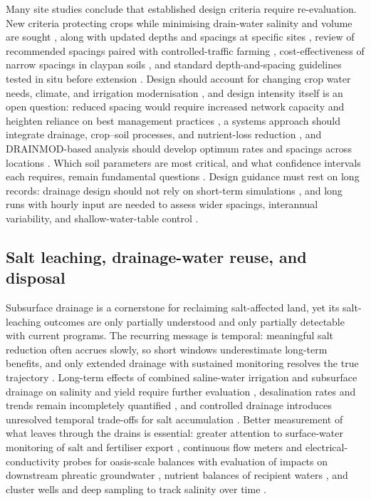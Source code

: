 Many site studies conclude that established design criteria require re-evaluation.
New criteria protecting crops while minimising drain-water salinity and volume are
sought \parencite{Christen2001}, along with updated depths and spacings at specific
sites \parencite{Muhammad2021,Malota2016,Bahçeci2009,Kahlown2002}, review of
recommended spacings paired with controlled-traffic farming
\parencite{Mante2022,Mante2018}, cost-effectiveness of narrow spacings in claypan
soils \parencite{Nelson2017}, and standard depth-and-spacing guidelines tested
in situ before extension \parencite{HajAmor2019}. Design should account for
changing crop water needs, climate, and irrigation modernisation
\parencite{Rui2024,Akram2013,Ziaeifar2025,Ritzema2023,Ritzema2007,Ritzema2006,Ritzema2011},
and design intensity itself is an open question: reduced spacing would require
increased network capacity and heighten reliance on best management practices
\parencite{Singh2009,Dialameh2025}, a systems approach should integrate drainage,
crop--soil processes, and nutrient-loss reduction \parencite{Castellano2019}, and
DRAINMOD-based analysis should develop optimum rates and spacings across locations
\parencite{Strock2011}. Which soil parameters are most critical, and what
confidence intervals each requires, remain fundamental questions
\parencite{Ayars2015,SHIRMOHAMMADI1995,HARDJOAMIDJOJO1982}. Design guidance must
rest on long records: drainage design should not rely on short-term simulations
\parencite{Wang2006b}, and long runs with hourly input are needed to assess wider
spacings, interannual variability, and shallow-water-table control
\parencite{Ale2009,Häggblom2019,Malota2015,Salo2019,Kladivko2023,Chang2012}.

\subsection{Salt leaching, drainage-water reuse, and disposal}

Subsurface drainage is a cornerstone for reclaiming salt-affected land, yet its
salt-leaching outcomes are only partially understood and only partially detectable
with current programs. The recurring message is temporal: meaningful salt
reduction often accrues slowly, so short windows underestimate long-term benefits,
and only extended drainage with sustained monitoring resolves the true trajectory
\parencite{Almen2021,Daigh2025}. Long-term effects of combined saline-water
irrigation and subsurface drainage on salinity and yield require further evaluation
\parencite{Feng2017,Feng2021}, desalination rates and trends remain incompletely
quantified \parencite{Guo2024b,Yao2024}, and controlled drainage introduces
unresolved temporal trade-offs for salt accumulation
\parencite{Jouni2018,Lu2019,Islam2025,Heng2021}. Better measurement of what leaves
through the drains is essential: greater attention to surface-water monitoring of
salt and fertiliser export \parencite{Mastrocicco2013}, continuous flow meters and
electrical-conductivity probes for oasis-scale balances with evaluation of impacts
on downstream phreatic groundwater \parencite{Askri2022}, nutrient balances of
recipient waters \parencite{Turtola1995}, and cluster wells and deep sampling to
track salinity over time \parencite{Singh2020d,Gafni2001}.

